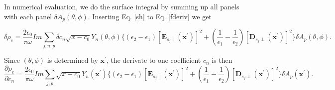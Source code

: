 \documentclass[12pt]{article}
\begin{document}
In numerical evaluation, we do the surface integral by summing up all panels with each panel $\delta A_p(\theta,\phi)$. Inserting Eq. \eqref{sh} to Eq. \eqref{fderiv} we get

\begin{equation}
\delta \rho_e =  \frac{2\epsilon_0}{\pi\omega}Im\sum_{j,n,p} \delta c_n\sqrt{x-c_0}Y_n(\theta,\phi) \{(\epsilon_2 -\epsilon_1) [\mathbf{E}_{s_j\parallel}(\mathbf{x}^\prime)]^2+ (\frac{1}{\epsilon_1}-\frac{1}{\epsilon_2})[\mathbf{D}_{s_j\perp}(\mathbf{x}^\prime)]^2\}\delta A_p(\theta,\phi).\label{sdelta}
\end{equation}

Since $(\theta,\phi)$ is determined by $\mathbf{x}^\prime$, the derivate to one coefficient $c_n$ is then
\begin{equation}
\frac{\partial \rho_e}{\partial c_n} =  \frac{2\epsilon_0}{\pi\omega}Im\sum_{j,p}\sqrt{x-c_0}Y_n(\mathbf{x}^\prime) \{(\epsilon_2 -\epsilon_1) [\mathbf{E}_{s_j\parallel}(\mathbf{x}^\prime)]^2+ (\frac{1}{\epsilon_1}-\frac{1}{\epsilon_2})[\mathbf{D}_{s_j\perp}(\mathbf{x}^\prime)]^2\}\delta A_p(\mathbf{x}^\prime).\label{sderiv}
\end{equation}
%
%
\end{document}
